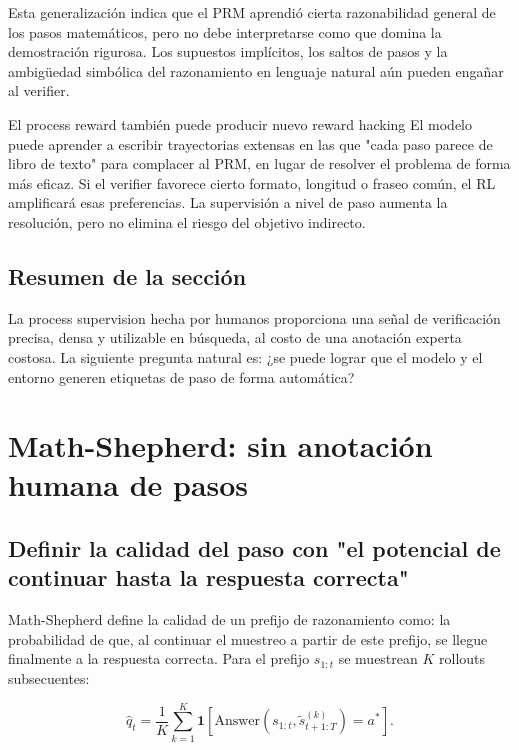 \documentclass[a4paper]{article}
\begin{document}

Esta generalización indica que el PRM aprendió cierta razonabilidad general de los pasos matemáticos, pero no debe interpretarse como que domina la demostración rigurosa. Los supuestos implícitos, los saltos de pasos y la ambigüedad simbólica del razonamiento en lenguaje natural aún pueden engañar al verifier.

\begin{warningbox}{El process reward también puede producir nuevo reward hacking}
El modelo puede aprender a escribir trayectorias extensas en las que "cada paso parece de libro de texto" para complacer al PRM, en lugar de resolver el problema de forma más eficaz. Si el verifier favorece cierto formato, longitud o fraseo común, el RL amplificará esas preferencias. La supervisión a nivel de paso aumenta la resolución, pero no elimina el riesgo del objetivo indirecto.
\end{warningbox}

\subsection{Resumen de la sección}

La process supervision hecha por humanos proporciona una señal de verificación precisa, densa y utilizable en búsqueda, al costo de una anotación experta costosa. La siguiente pregunta natural es: ¿se puede lograr que el modelo y el entorno generen etiquetas de paso de forma automática?

\section{Math-Shepherd: sin anotación humana de pasos}

\subsection{Definir la calidad del paso con "el potencial de continuar hasta la respuesta correcta"}

Math-Shepherd define la calidad de un prefijo de razonamiento como: la probabilidad de que, al continuar el muestreo a partir de este prefijo, se llegue finalmente a la respuesta correcta. Para el prefijo $s_{1:t}$ se muestrean $K$ rollouts subsecuentes:

$$
\hat q_t=\frac{1}{K}\sum_{k=1}^{K}
\mathbf 1\!\left[\mathrm{Answer}(s_{1:t},\tilde s^{(k)}_{t+1:T})=a^*\right].
$$
\end{document}
